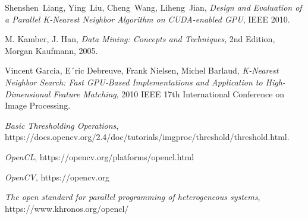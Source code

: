 \documentclass[conference]{IEEEtran}
\begin{document}


%
%
%
\begin{thebibliography}{1}

Shenshen~Liang, Ying~Liu, Cheng~Wang, Liheng~Jian, \emph{Design and Evaluation of a Parallel K-Nearest Neighbor Algorithm on
CUDA-enabled GPU}, IEEE 2010.
  
 M. Kamber, J. Han, \emph{Data Mining: Concepts and Techniques}, 2nd Edition, Morgan Kaufmann, 2005.
  
 Vincent Garcia, E´ric Debreuve, Frank Nielsen, Michel Barlaud, \emph{K-Nearest Neighbor Search: Fast GPU-Based Implementations and Application
 to High-Dimensional Feature Matching}, 2010 IEEE 17th International Conference on Image Processing.
 
 \emph{Basic Thresholding Operations},\\ https://docs.opencv.org/2.4/doc/tutorials/imgproc/threshold/threshold.html.
 
 \emph{OpenCL}, https://opencv.org/platforms/opencl.html
 
 \emph{OpenCV}, https://opencv.org
 
 \emph{The open standard for parallel programming of heterogeneous systems}, https://www.khronos.org/opencl/

\end{thebibliography}




\end{document}
